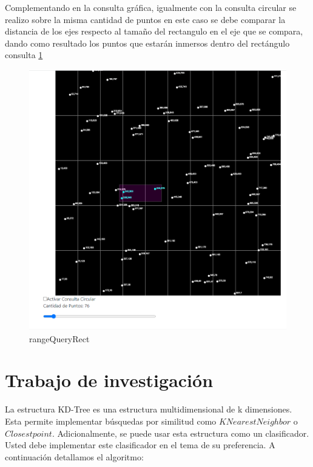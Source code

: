 \documentclass{article}
\begin{document}
    	    
    	    
    	    Complementando en la consulta gráfica, igualmente con la consulta circular se realizo sobre la misma cantidad de puntos en este caso se debe comparar la distancia de los ejes respecto al tamaño del rectangulo en el eje que se compara, dando como resultado los puntos que estarán inmersos dentro del rectángulo consulta \ref{fig:rectangulo1}
    		
    		\begin{figure}[H]
    			\centering
    			\includegraphics[scale=0.45]{img/rectangular1.png}
    			\caption{rangeQueryRect}
    			\label{fig:rectangulo1}
    		\end{figure}
    		
		
		\section{Trabajo de investigación}
		    La estructura KD-Tree es una estructura multidimensional de k dimensiones. Esta permite implementar 
		    búsquedas por similitud como $K Nearest Neighbor$ o $Closest point$. Adicionalmente, se puede
            usar esta estructura como un clasificador. Usted debe implementar este clasificador en el tema de su
            preferencia. A continuación detallamos el algoritmo:
            
\end{document}
